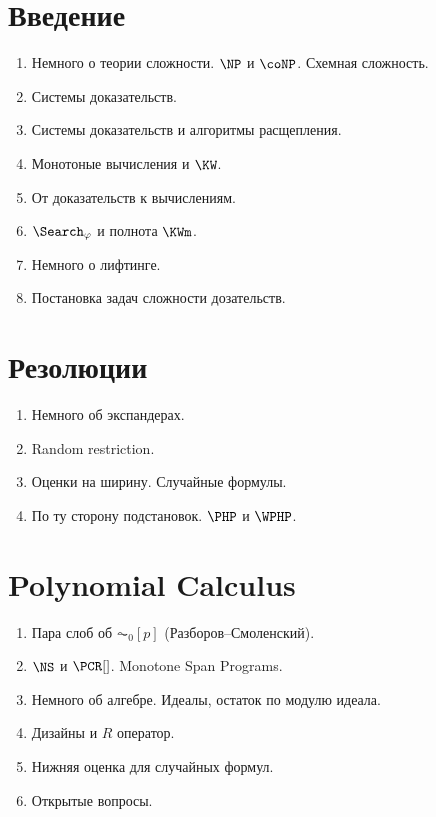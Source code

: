 \section{Введение}

\begin{enumerate}
    \item Немного о теории сложности. $\NP$ и $\coNP$. Схемная сложность.
    \item Системы доказательств.
    \item Системы доказательств и алгоритмы расщепления.
    \item Монотоные вычисления и $\KW$.
    \item От доказательств к вычислениям.
    \item $\Search_{\varphi}$ и полнота $\KWm$.
    \item Немного о лифтинге.
    \item Постановка задач сложности дозательств.
\end{enumerate}

\section{Резолюции}

\begin{enumerate}
    \item Немного об экспандерах.
    \item Random restriction.
    \item Оценки на ширину. Случайные формулы.
    \item По ту сторону подстановок. $\PHP$ и $\WPHP$.
\end{enumerate}


\section{Polynomial Calculus}

\begin{enumerate}
    \item Пара слоб об $\AC_0[p]$ (Разборов--Смоленский).
    \item $\NS$ и $\PCR[]$. Monotone Span Programs.
    \item Немного об алгебре. Идеалы, остаток по модулю идеала.
    \item Дизайны и $R$ оператор.
    \item Нижняя оценка для случайных формул.
    \item Открытые вопросы.
\end{enumerate}